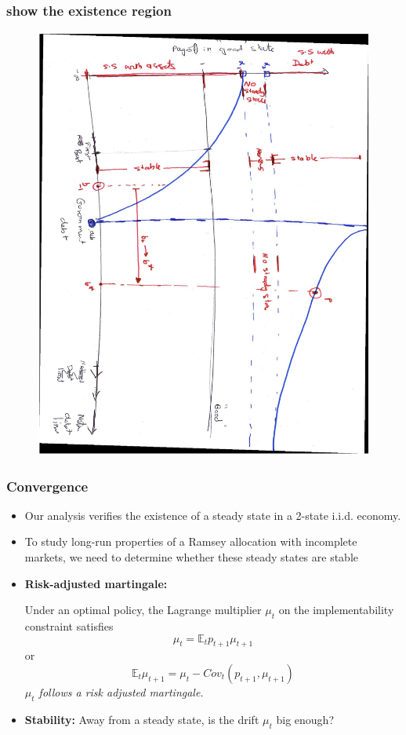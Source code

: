\documentclass{beamer}
\newcommand{\EE}{\mathbb E}
\begin{document}
\begin{frame}
   \frametitle{show the existence region}
	\begin{figure}
		\begin{center}
		\includegraphics[scale=.3,angle=90]{Images/tempGraph.eps}
	\end{center}	
	\end{figure}

  \end{frame}

  
 \begin{frame}
  \frametitle{Convergence}
  \begin{itemize}
		\item Our analysis verifies the existence of a steady state in a 2-state i.i.d. economy.
		\item To study long-run properties of a Ramsey allocation with incomplete markets, we need to determine whether these steady states are stable
		\item \textbf{Risk-adjusted martingale:}
		
		Under an optimal policy, the Lagrange multiplier $\mu_t$ on the implementability  constraint   satisfies
		\[
			\mu_t = \EE_t p_{t+1} \mu_{t+1}
		\] or
		\[
		\EE_t  \mu_{t+1}	= \mu_t -Cov_t (p_{t+1}, \mu_{t+1})
		\]
			\emph{$\mu_t$ follows a risk adjusted martingale.}
	
		\item \textbf{Stability: }   Away from a steady state, is the drift  $\mu_t$ big enough?
		\end{itemize}
	
 \end{frame}
\end{document}
